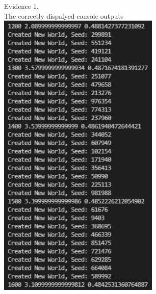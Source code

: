 \begin{flushleft}
\begin{center}
        {\large Evidence 1.\rn } \\ 
        \vspace{0.3cm}
        The correctly dispalyed console outputs \\
        \includegraphics[width=8cm]{Images/Testing/T1.10.1.PNG} \\
    \end{center}
   
\end{flushleft}